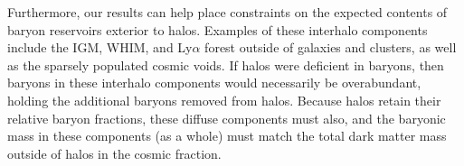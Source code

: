 Furthermore, our results can help place constraints on the expected
contents of baryon reservoirs exterior to halos. Examples of these
interhalo components include the IGM, WHIM, and Ly$\alpha$ forest
outside of galaxies and clusters, as well as the sparsely populated
cosmic voids. If halos were deficient in baryons, then baryons in
these interhalo components would necessarily be overabundant, holding
the additional baryons removed from halos. Because halos retain their
relative baryon fractions, these diffuse components must also, and the
baryonic mass in these components (as a whole) must match the total
dark matter mass outside of halos in the cosmic fraction. 

